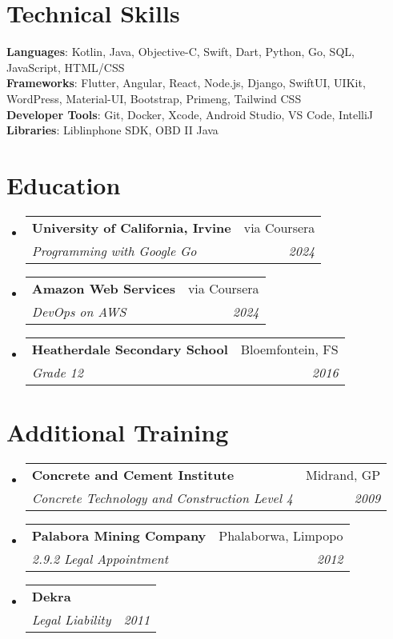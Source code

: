 \documentclass[letterpaper,11pt]{article}
\makeatletter
\newcommand{\resumeSubheading}[4]{
  \vspace{-2pt}\item
    \begin{tabular*}{0.97\textwidth}[t]{l@{\extracolsep{\fill}}r}
      \textbf{#1} & #2 \\
      \textit{\small#3} & \textit{\small #4} \\
    \end{tabular*}\vspace{-7pt}
}
\newcommand{\resumeSubHeadingListStart}{\begin{itemize}[leftmargin=0.15in, label={}]}
\newcommand{\resumeSubHeadingListEnd}{\end{itemize}}
\makeatother
\begin{document}
%
\section{Technical Skills}
 \begin{itemize}[leftmargin=0.15in, label={}]
    \small{\item{
     \textbf{Languages}{: Kotlin, Java, Objective-C, Swift, Dart, Python, Go, SQL, JavaScript, HTML/CSS} \\
     \textbf{Frameworks}{: Flutter, Angular, React, Node.js, Django, SwiftUI, UIKit, WordPress, Material-UI, Bootstrap, Primeng, Tailwind CSS} \\
     \textbf{Developer Tools}{: Git, Docker, Xcode, Android Studio, VS Code,  IntelliJ} \\
     \textbf{Libraries}{: Liblinphone SDK, OBD II Java}
    }}
 \end{itemize}

\section{Education}
  \resumeSubHeadingListStart
    \resumeSubheading
      {University of California, Irvine }{via Coursera}
      {Programming with Google Go}{2024}
    \resumeSubheading
      {Amazon Web Services}{via Coursera}
      {DevOps on AWS}{2024}
    \resumeSubheading
      {Heatherdale Secondary School}{Bloemfontein, FS}
      {Grade 12}{2016}
  \resumeSubHeadingListEnd
  \section{Additional Training}
  \resumeSubHeadingListStart
    \resumeSubheading
      {Concrete and Cement Institute}{Midrand, GP}
      {Concrete Technology and Construction Level 4}{2009}
    \resumeSubheading
      {Palabora Mining Company}{Phalaborwa, Limpopo}
      {2.9.2 Legal Appointment}{2012}
    \resumeSubheading
      {Dekra}{} 
      {Legal Liability}{2011}
  \resumeSubHeadingListEnd

\end{document}
